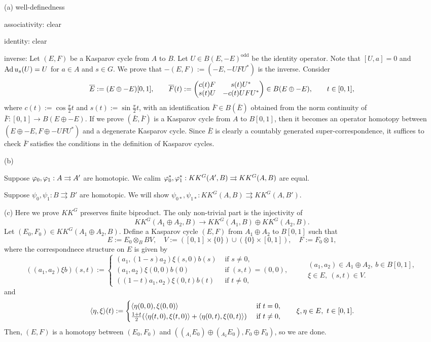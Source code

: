 \documentclass{../../large}
\begin{document}
\begin{pf}
(a)
well-definedness

associativity: clear

identity: clear

inverse:
Let $(E,F)$ be a Kasparov cycle from $A$ to $B$.
Let $U\in B(E,-E)^{\mathrm{odd}}$ be the identity operator.
Note that $[U,a]=0$ and $\operatorname{Ad} u_s(U)=U$ for $a\in A$ and $s\in G$.
We prove that $-(E,F):=(-E,-UFU^*)$ is the inverse.
Consider
\[\overline E:=(E\oplus-E)[0,1],\qquad \overline F(t):=\begin{pmatrix}c(t)F&s(t)U^*\\s(t)U&-c(t)UFU^*\end{pmatrix}\in B(E\oplus-E),\qquad t\in[0,1],\]
where $c(t):=\cos\frac\pi2t$ and $s(t):=\sin\frac\pi2t$, with an identification $\bar F\in B(\bar E)$ obtained from the norm continuity of $\bar F:[0,1]\to B(E\oplus-E)$.
If we prove $(\bar E,\bar F)$ is a Kasparov cycle from $A$ to $B[0,1]$, then it becomes an operator homotopy between $(E\oplus-E,F\oplus-UFU^*)$ and a degenerate Kasparov cycle.
Since $\bar E$ is clearly a countably generated super-correspondence, it suffices to check $\bar F$ satisfies the conditions in the definition of Kasparov cycles.

(b)

Suppose $\varphi_0,\varphi_1:A\rightrightarrows A'$ are homotopic.
We calim $\varphi_0^*,\varphi_1^*:KK^G(A',B)\rightrightarrows KK^G(A,B)$ are equal.

Suppose $\psi_0,\psi_1: B\rightrightarrows B'$ are homotopic.
We will show $\psi_{0*},\psi_{1*}:KK^G(A,B)\rightrightarrows KK^G(A,B')$.


(c)
Here we prove $KK^G$ preserves finite biproduct.
The only non-trivial part is the injectivity of
\[KK^G(A_1\oplus A_2,B)\to KK^G(A_1,B)\oplus KK^G(A_2,B).\]
Let $(E_0,F_0)\in KK^G(A_1\oplus A_2,B)$.
Define a Kasparov cycle $(E,F)$ from $A_1\oplus A_2$ to $B[0,1]$ such that
\[E:=E_0\otimes_BBV,\quad V:=([0,1]\times\{0\})\cup(\{0\}\times[0,1]),\quad F:=F_0\otimes1,\]
where the correspondnece structure on $E$ is given by
\[((a_1,a_2)\xi b)(s,t):=\begin{cases}
(a_1,(1-s)a_2)\xi(s,0)b(s)&\text{ if }s\ne0,\\
(a_1,a_2)\xi(0,0)b(0)&\text{ if }(s,t)=(0,0),\\
((1-t)a_1,a_2)\xi(0,t)b(t)&\text{ if }t\ne0,
\end{cases}
\qquad
\begin{gathered}
(a_1,a_2)\in A_1\oplus A_2,\ b\in B[0,1],\\
\xi\in E,\ (s,t)\in V.
\end{gathered}\]
and
\[\langle\eta,\xi\rangle(t):=\begin{cases}
\langle\eta(0,0),\xi(0,0)\rangle&\text{ if }t=0,\\
\frac{1+t}2(\langle\eta(t,0),\xi(t,0)\rangle+\langle\eta(0,t),\xi(0,t)\rangle)&\text{ if }t\ne0,
\end{cases}
\qquad \xi,\eta\in E,\ t\in[0,1].\]
Then, $(E,F)$ is a homotopy between $(E_0,F_0)$ and $((_{A_1}E_0)\oplus(_{A_2}E_0),F_0\oplus F_0)$, so we are done.
\end{pf}
\end{document}
